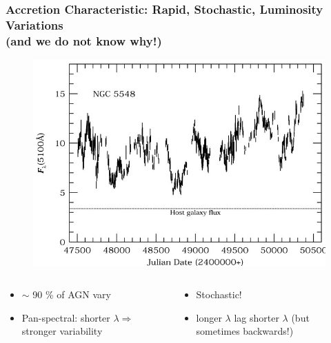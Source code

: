 \documentclass[hyperref={pdfpagelabels=false}]{beamer}
\begin{document}
\begin{frame}
\frametitle{Accretion Characteristic: Rapid, Stochastic, Luminosity Variations\\(and we do not know why!)}
  \begin{figure}
    \includegraphics[scale=0.2]{images/NGC5548_Variability.jpg}
  \end{figure}
  \centering
    {\tiny \citep{Peterson99}}
  \begin{columns}
  \centering
    \begin{column}{0.5\textwidth}
      \begin{itemize}
        \item $\sim$ 90 \% of AGN vary {\tiny \citep{Sesar07}}
        \item Pan-spectral: shorter $\lambda \Rightarrow$ stronger variability
      \end{itemize}
    \end{column}
    \begin{column}{0.5\textwidth}
      \begin{itemize}
        \item Stochastic! {\tiny \citep{Peterson}}
        \item longer $\lambda$ lag shorter $\lambda$ (but sometimes backwards!)
      \end{itemize}
    \end{column}
  \end{columns}
\end{frame}
\end{document}
